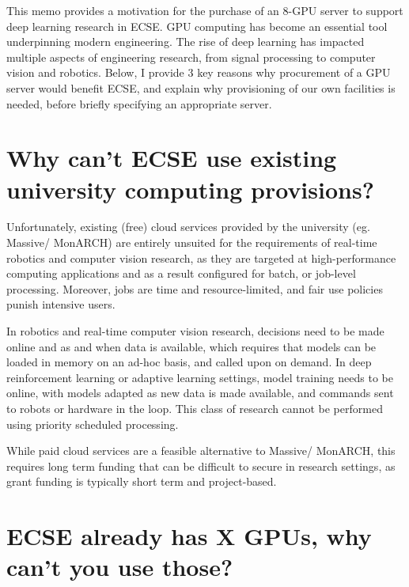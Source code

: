 \documentclass[12pt]{texMemo} %
\begin{document}
\maketitle

This memo provides a motivation for the purchase of an 8-GPU server to support deep learning research in ECSE. GPU computing has become an essential tool underpinning modern engineering. The rise of deep learning has impacted multiple aspects of engineering research, from signal processing to computer vision and robotics. Below, I provide 3 key reasons why procurement of a GPU server would benefit ECSE, and explain why provisioning of our own facilities is needed, before briefly specifying an appropriate server. 

\section{Why can't ECSE use existing university computing provisions?}

Unfortunately, existing (free) cloud services provided by the university (eg. Massive/ MonARCH) are entirely unsuited for the requirements of real-time robotics and computer vision research, as they are targeted at high-performance computing applications and as a result configured for batch, or job-level processing. Moreover, jobs are time and resource-limited, and fair use policies punish intensive users. 

In robotics and real-time computer vision research, decisions need to be made online and as and when data is available, which requires that models can be loaded in memory on an ad-hoc basis, and called upon on demand. In deep reinforcement learning or adaptive learning settings, model training needs to be online, with models adapted as new data is made available, and commands sent to robots or hardware in the loop. This class of research cannot be performed using priority scheduled processing. 

While paid cloud services are a feasible alternative to Massive/ MonARCH, this requires long term funding that can be difficult to secure in research settings, as grant funding is typically short term and project-based.

\section{ECSE already has X GPUs, why can't you use those?}
\end{document}
